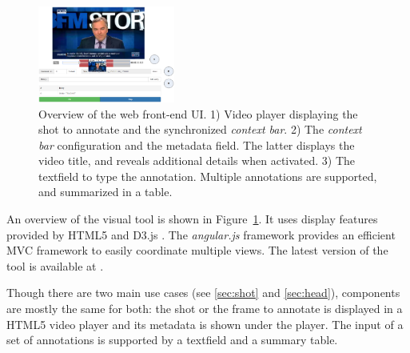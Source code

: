 \documentclass[a4paper]{article}
\begin{document}
\begin{figure}[h]
	\centering
 	\includegraphics[width=0.4\textwidth]{camomile_ui-bis.png}
	\caption{Overview of the web front-end UI. 1) Video player displaying the shot to annotate and the synchronized \emph{context bar}. 2) The \emph{context bar} configuration and the metadata field. The latter displays the video title, and reveals additional details when activated. 3) The textfield to type the annotation. Multiple annotations are supported, and summarized in a table.}
	\label{fig:frontend}

\end{figure}


An overview of the visual tool is shown in Figure~\ref{fig:frontend}. It uses display features provided by HTML5 and D3.js \cite{d3js}. The \textit{angular.js} framework \cite{angularjs} provides an efficient MVC framework to easily coordinate multiple views. The latest version of the tool is available at \cite{urlfrontend}.



Though there are two main use cases (see \ref{sec:shot} and \ref{sec:head}), components are mostly the same for both: the shot or the frame to annotate is displayed in a HTML5 video player and its metadata is shown under the player. The input of a set of annotations is supported by a textfield and a summary table. 

\end{document}
